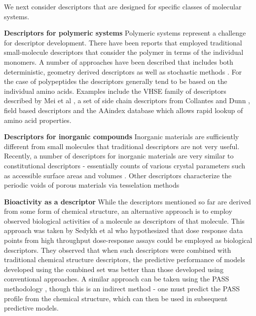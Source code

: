\documentclass[letterpaper, 12pt]{article}
\begin{document}
We next consider descriptors that are designed for specific classes of
molecular systems.

\textbf{Descriptors for polymeric systems} Polymeric systems represent
a challenge for descriptor development. There have been reports that
employed traditional small-molecule descriptors
\cite{Mattioni:2002dq,Katritzky:1998cr} that consider the polymer in
terms of the individual monomers. A number of approaches have been
described that includes both deterministic, geometry derived
descriptors \cite{Edvinsson:2003bh} as well as stochastic methods
\cite{Gonzales-Diaz:2003ly}. For the case of polypeptides the
descriptors generally tend to be based on the individual amino
acids. Examples include the VHSE family of descriptors described by
Mei et al \cite{Mei:2005kx}, a set of side chain descriptors from
Collantes and Dunn \cite{Collantes:1995vn}, field based descriptors
\cite{Norinder:1991ys} and the AAindex database
\cite{Kawashima:1999zr} which allows rapid lookup of amino acid
properties.

\textbf{Descriptors for inorganic compounds} Inorganic materials are
sufficiently different from small molecules that traditional
descriptors are not very useful. Recently, a number of descriptors for
inorganic materials are very similar to constitutional descriptors -
essentially counts of various crystal parameters such as accessible
surface areas and volumes
\cite{Willems:2012zr,Haranczyk:2010ys,Mackay:1984ve}. Other
descriptors characterize the periodic voids of porous materials via
tesselation methods \cite{Anurova:2009ly,Carr:2009kx}

\textbf{Bioactivity as a descriptor} While the descriptors mentioned
so far are derived from some form of chemical structure, an
alternative approach is to employ observed biological activities of a
molecule as descriptors of that molecule.  This approach was taken by
Sedykh et al \cite{Sedykh:2011fk} who hypothesized that dose response
data points from high throughput dose-response assays could be employed
as biological descriptors. They observed that when such descriptors
were combined with traditional chemical structure descriptors, the
predictive performance of models developed using the combined set was
better than those developed using conventional approaches. A similar
approach can be taken using the PASS methodology
\cite{Poroikov:2007aa}, though this is an indirect method - one must
predict the PASS profile from the chemical structure, which can then
be used in subsequent predictive models.
\end{document}
